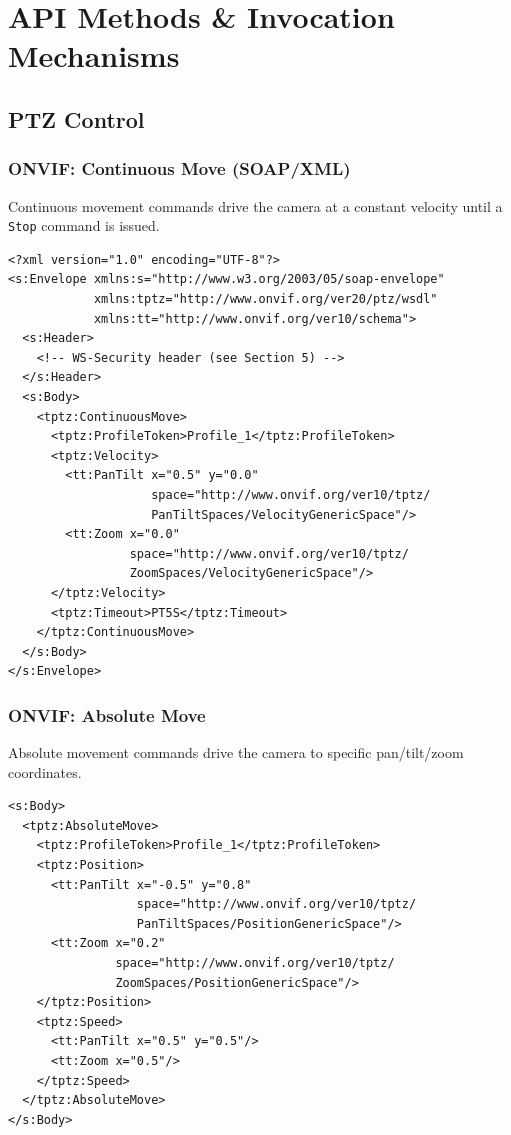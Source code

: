 \documentclass[12pt,a4paper]{article}
\begin{document}
\section{API Methods \& Invocation Mechanisms}

\subsection{PTZ Control}

\subsubsection{ONVIF: Continuous Move (SOAP/XML)}
Continuous movement commands drive the camera at a constant velocity until a \texttt{Stop} command is issued.

\begin{lstlisting}[style=xmlstyle, caption=ONVIF ContinuousMove SOAP Request]
<?xml version="1.0" encoding="UTF-8"?>
<s:Envelope xmlns:s="http://www.w3.org/2003/05/soap-envelope"
            xmlns:tptz="http://www.onvif.org/ver20/ptz/wsdl"
            xmlns:tt="http://www.onvif.org/ver10/schema">
  <s:Header>
    <!-- WS-Security header (see Section 5) -->
  </s:Header>
  <s:Body>
    <tptz:ContinuousMove>
      <tptz:ProfileToken>Profile_1</tptz:ProfileToken>
      <tptz:Velocity>
        <tt:PanTilt x="0.5" y="0.0"
                    space="http://www.onvif.org/ver10/tptz/
                    PanTiltSpaces/VelocityGenericSpace"/>
        <tt:Zoom x="0.0"
                 space="http://www.onvif.org/ver10/tptz/
                 ZoomSpaces/VelocityGenericSpace"/>
      </tptz:Velocity>
      <tptz:Timeout>PT5S</tptz:Timeout>
    </tptz:ContinuousMove>
  </s:Body>
</s:Envelope>
\end{lstlisting}

\subsubsection{ONVIF: Absolute Move}
Absolute movement commands drive the camera to specific pan/tilt/zoom coordinates.

\begin{lstlisting}[style=xmlstyle, caption=ONVIF AbsoluteMove SOAP Request]
<s:Body>
  <tptz:AbsoluteMove>
    <tptz:ProfileToken>Profile_1</tptz:ProfileToken>
    <tptz:Position>
      <tt:PanTilt x="-0.5" y="0.8"
                  space="http://www.onvif.org/ver10/tptz/
                  PanTiltSpaces/PositionGenericSpace"/>
      <tt:Zoom x="0.2"
               space="http://www.onvif.org/ver10/tptz/
               ZoomSpaces/PositionGenericSpace"/>
    </tptz:Position>
    <tptz:Speed>
      <tt:PanTilt x="0.5" y="0.5"/>
      <tt:Zoom x="0.5"/>
    </tptz:Speed>
  </tptz:AbsoluteMove>
</s:Body>
\end{lstlisting}
\end{document}
